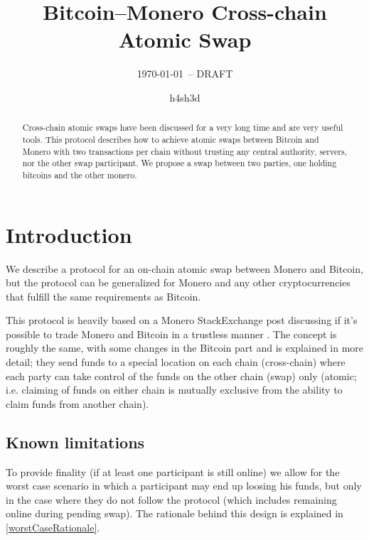 \documentclass{llncs}
\begin{document}
\title{Bitcoin--Monero Cross-chain Atomic Swap}
\author{h4sh3d}

\subtitle{{\normalsize\today{\small\ -- DRAFT}}}

\maketitle

\begin{abstract}
    Cross-chain atomic swaps have been discussed for a very long time and are very useful tools. This protocol describes how to achieve atomic swaps between Bitcoin and Monero with two transactions per chain without trusting any central authority, servers, nor the other swap participant. We propose a swap between two parties, one holding bitcoins and the other monero.
\end{abstract}

\section{Introduction}
We describe a protocol for an on-chain atomic swap between Monero and Bitcoin, but the protocol can be generalized for Monero and any other cryptocurrencies that fulfill the same requirements as Bitcoin.

This protocol is heavily based on a Monero StackExchange post discussing if it's possible to trade Monero and Bitcoin in a trustless manner \cite{MoneroStackexchangeSwap}. The concept is roughly the same, with some changes in the Bitcoin part and is explained in more detail; they send funds to a special location on each chain (cross-chain) where each party can take control of the funds on the other chain (swap) only (atomic; i.e. claiming of funds on either chain is mutually exclusive from the ability to claim funds from another chain).

\subsection{Known limitations}
To provide finality (if at least one participant is still online) we allow for the worst case scenario in which a participant may end up loosing his funds, but only in the case where they do not follow the protocol (which includes remaining online during pending swap). The rationale behind this design is explained in \ref{worstCaseRationale}.
\end{document}
